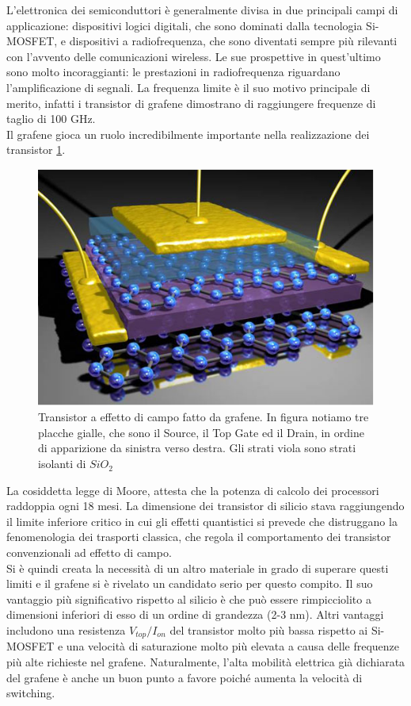 \documentclass[a4paper,titlepage]{book}
\begin{document}
L'elettronica dei semiconduttori è generalmente divisa in due principali campi di applicazione: dispositivi logici digitali, che sono dominati dalla tecnologia Si-MOSFET, e dispositivi a radiofrequenza, che sono diventati sempre più rilevanti con l'avvento delle comunicazioni wireless.
Le sue prospettive in quest'ultimo sono molto incoraggianti: le prestazioni in radiofrequenza  riguardano l'amplificazione di segnali. La frequenza limite è il suo motivo principale di merito, infatti i transistor di grafene dimostrano di raggiungere frequenze di taglio di 100 GHz.\\
Il grafene gioca un ruolo incredibilmente importante nella realizzazione dei transistor \ref{trans}. \\
 \begin{figure}[h!] 
	\centering
	\includegraphics[width=0.5\columnwidth]{transistor.png}
	\caption{ 	\label{trans}
		Transistor a effetto di campo fatto da grafene. In figura notiamo tre placche gialle, che sono il Source, il Top Gate ed il Drain, in ordine di apparizione da sinistra verso destra. Gli strati viola sono strati isolanti di $SiO_2$
	}
\end{figure}
La cosiddetta legge di Moore, attesta che la potenza di calcolo dei processori raddoppia ogni 18 mesi. La dimensione dei transistor di silicio stava raggiungendo il limite inferiore critico in cui gli effetti quantistici si prevede che distruggano la fenomenologia dei trasporti classica, che regola il comportamento dei transistor convenzionali ad effetto di campo.\\
Si è quindi creata la necessità di un altro materiale in grado di superare questi limiti e il grafene si è rivelato un candidato serio per questo compito. Il suo vantaggio più significativo rispetto al silicio è che può essere rimpicciolito a dimensioni inferiori di esso di un ordine di grandezza (2-3 nm). Altri vantaggi includono una resistenza $V_{top}/I_{on}$ del transistor molto più bassa rispetto ai Si-MOSFET e una velocità di saturazione molto più elevata a causa delle frequenze più alte richieste nel grafene. Naturalmente, l'alta mobilità elettrica già dichiarata del grafene è anche un buon punto a favore poiché aumenta la velocità di switching.
\end{document}
